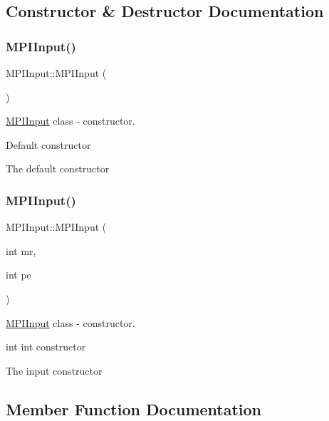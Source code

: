\subsection{Constructor \& Destructor Documentation}
\mbox{\label{classMPIInput_a1fd40b314f5e63f0948050dd687f2d6d}} 
\subsubsection{\texorpdfstring{M\+P\+I\+Input()}{MPIInput()}\hspace{0.1cm}{\footnotesize\ttfamily [1/2]}}
{\footnotesize\ttfamily M\+P\+I\+Input\+::\+M\+P\+I\+Input (\begin{DoxyParamCaption}{ }\end{DoxyParamCaption})}



\hyperlink{classMPIInput}{M\+P\+I\+Input} class -\/ constructor. 

Default constructor

The default constructor \mbox{\label{classMPIInput_aad9097968754daede74b4e9931f58c8a}} 
\subsubsection{\texorpdfstring{M\+P\+I\+Input()}{MPIInput()}\hspace{0.1cm}{\footnotesize\ttfamily [2/2]}}
{\footnotesize\ttfamily M\+P\+I\+Input\+::\+M\+P\+I\+Input (\begin{DoxyParamCaption}\item[{int}]{mr,  }\item[{int}]{pe }\end{DoxyParamCaption})}



\hyperlink{classMPIInput}{M\+P\+I\+Input} class -\/ constructor. 

int int constructor

The input constructor 

\subsection{Member Function Documentation}
\mbox{\label{classMPIInput_a5204b6d3bea6d1d6110b6d180da43e07}} 
